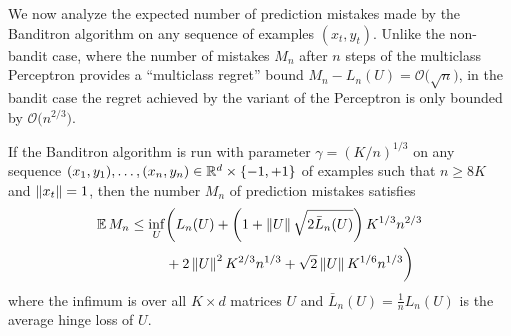 We now analyze the expected number of prediction mistakes made by the Banditron algorithm on any sequence of examples $(x_t,y_t)$. Unlike the non-bandit case, where the number of mistakes $M_n$
after $n$ steps of the multiclass Perceptron provides a ``multiclass regret'' bound $M_n - L_n(U) = \mathcal{O}\bigl(\sqrt{n}\bigr)$, in the bandit case the regret achieved by the variant of the Perceptron is only bounded by $\mathcal{O}\bigl(n^{2/3}\bigr)$.
%
\begin{theorem}
If the Banditron algorithm is run with parameter $\gamma = (K/n)^{1/3}$ on any sequence $(x_1,y_1),\dots,(x_n,y_n) \in \mathbb{R}^d\times\{-1,+1\}$ of examples such that $n \ge 8K$ and $\left\|{x_t}\right\| = 1$, then the number $M_n$ of prediction mistakes satisfies
\begin{align*}
    \mathbb{E}\,M_n
\le
    \inf_{U}&\biggl( L_n(U) + \left(1 + \left\|{U}\right\|\sqrt{2\bar{L}_n(U)}\right)K^{1/3}n^{2/3}
\\ &+ 2\left\|{U}\right\|^2 K^{2/3}n^{1/3} + \sqrt{2}\left\|{U}\right\| K^{1/6}n^{1/3}\biggr)
\end{align*}
where the infimum is over all $K \times d$ matrices $U$ and $\bar{L}_n(U) = \tfrac{1}{n}L_n(U)$ is the average hinge loss of $U$.
\end{theorem}
%
